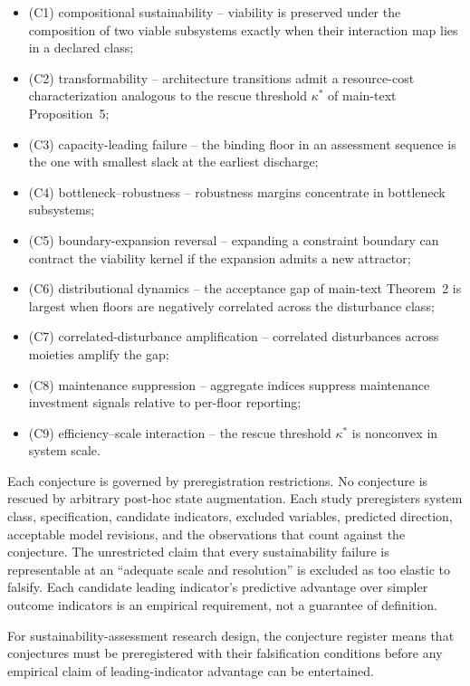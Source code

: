 \documentclass[preprint,11pt,authoryear]{elsarticle}
\theoremstyle{remark}
\begin{document}
\begin{itemize}[leftmargin=2em]
\item (C1) compositional sustainability -- viability is preserved under the composition of two viable subsystems exactly when their interaction map lies in a declared class;
\item (C2) transformability -- architecture transitions admit a resource-cost characterization analogous to the rescue threshold $\kappa^*$ of main-text Proposition~5;
\item (C3) capacity-leading failure -- the binding floor in an assessment sequence is the one with smallest slack at the earliest discharge;
\item (C4) bottleneck--robustness -- robustness margins concentrate in bottleneck subsystems;
\item (C5) boundary-expansion reversal -- expanding a constraint boundary can contract the viability kernel if the expansion admits a new attractor;
\item (C6) distributional dynamics -- the acceptance gap of main-text Theorem~2 is largest when floors are negatively correlated across the disturbance class;
\item (C7) correlated-disturbance amplification -- correlated disturbances across moieties amplify the gap;
\item (C8) maintenance suppression -- aggregate indices suppress maintenance investment signals relative to per-floor reporting;
\item (C9) efficiency--scale interaction -- the rescue threshold $\kappa^*$ is nonconvex in system scale.
\end{itemize}

Each conjecture is governed by preregistration restrictions. No conjecture is rescued by arbitrary post-hoc state augmentation. Each study preregisters system class, specification, candidate indicators, excluded variables, predicted direction, acceptable model revisions, and the observations that count against the conjecture. The unrestricted claim that every sustainability failure is representable at an ``adequate scale and resolution'' is excluded as too elastic to falsify. Each candidate leading indicator's predictive advantage over simpler outcome indicators is an empirical requirement, not a guarantee of definition.

For sustainability-assessment research design, the conjecture register means that conjectures must be preregistered with their falsification conditions before any empirical claim of leading-indicator advantage can be entertained.
\end{document}
